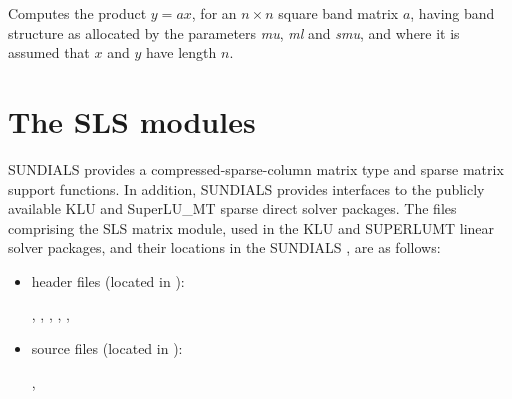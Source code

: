\documentclass[letterpaper,10pt,english]{sphinxmanual}
\begin{document}

\begin{fulllineitems}
\label{linear_solvers/DLS:c.bandMatvec}
Computes the product \(y = ax\), for an \(n\times n\)
square band matrix \(a\), having band structure as allocated by
the parameters \emph{mu}, \emph{ml} and \emph{smu}, and where it is assumed that
\(x\) and \(y\) have length \(n\).

\end{fulllineitems}



\section{The SLS modules}
\label{linear_solvers/SLS:the-sls-modules}\label{linear_solvers/SLS::doc}\label{linear_solvers/SLS:linearsolvers-sls}
SUNDIALS provides a compressed-sparse-column matrix type and sparse
matrix support functions.  In addition, SUNDIALS provides interfaces
to the publicly available KLU and SuperLU\_MT sparse direct solver
packages.  The files comprising the SLS matrix module, used in the KLU
and SUPERLUMT linear solver packages, and their locations in the
SUNDIALS , are as follows:
\begin{itemize}
\item {} 
header files (located in ):

, ,
, ,
, 

\item {} 
source files (located in ):

, 

\end{itemize}
\end{document}
